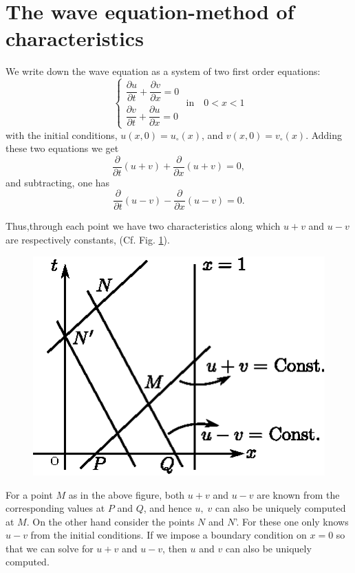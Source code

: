 \section{The wave equation-method of characteristics}\label{chap5:sec5.4}
We write down the wave equation as a system of two first order
equations:
\begin{equation*}
\begin{cases}
\dfrac{\partial u}{\partial t} + \dfrac{\partial v}{\partial x} = 0\\[5pt]
\dfrac{\partial v}{\partial t} + \dfrac{\partial u}{\partial x} = 0
\end{cases} \text{ in} \quad 0< x < 1 \tag{5.7}\label{eq5.7}
\end{equation*}
with the initial conditions, $u(x,0) = u_\circ(x)$, and $v(x,0) =
v_\circ (x)$. Adding these two equations we get
\begin{equation*}
\frac{\partial}{\partial t} (u+v) + \frac{\partial}{\partial x} (u+v)
= 0, \tag{5.8}\label{eq5.8}
\end{equation*}
and subtracting, one has
\begin{equation*}
\frac{\partial}{\partial t} (u-v) - \frac{\partial}{\partial x} (u-v)
= 0.  \tag{5.9}\label{eq5.9}
\end{equation*}

Thus,\pageoriginale through each point we have two characteristics
along which $u+v$ and $u-v$ are respectively constants,
(Cf. Fig. \ref{c5:fig5.2}).

\begin{figure}[H]
\centering
\includegraphics{figures/fig52-5.2.eps}
\caption{}\label{c5:fig5.2}
\end{figure}

For a point $M$ as in the above figure, both $u+v$ and $u-v$ are known
from the corresponding values at $P$ and $Q$, and hence $u, \; v$ can
also be uniquely computed at $M$. On the other hand consider the
points $N$ and $N$'. For these one only knows $u-v$ from the initial
conditions. If we impose a boundary condition on $x=0$ so that we can
solve for $u+v$ and $u-v$, then $u$ and $v$ can also be uniquely
computed.

